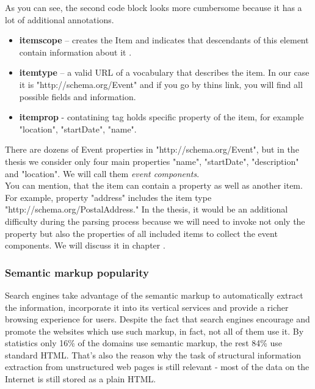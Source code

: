 As you can see, the second code block looks more cumbersome because it has a lot of additional annotations. 

\begin{itemize}
    \item \textbf{itemscope} – creates the Item and indicates that descendants of this element contain information about it \cite{Microdata}.
    \item \textbf{itemtype} – a valid URL of a vocabulary that describes the item. In our case it is "http://schema.org/Event" and if you go by thins link, you will find all possible fields and information. 
    \item \textbf{itemprop} - contatining tag holds specific property of the item, for example "location", "startDate", "name".
\end{itemize}

There are dozens of Event properties in "http://schema.org/Event", but in the thesis we consider only four main properties "name", "startDate", "description" and "location". We will call them \textit{event components}.\\

You can mention, that the item can contain a property as well as another item. For example, property "address" includes the item type "http://schema.org/PostalAddress." In the thesis, it would be an additional difficulty during the parsing process because we will need to invoke not only the property but also the properties of all included items to collect the event components. We will discuss it in chapter . 

\subsubsection*{Semantic markup popularity}

Search engines take advantage of the semantic markup to automatically extract the information, incorporate it into its vertical services and provide a richer browsing experience for users. Despite the fact that search engines encourage and promote the websites which use such markup, in fact, not all of them use it. By statistics only 16\% of the domains use semantic markup, the rest 84\% use standard HTML. That's also the reason why the task of structural information extraction from unstructured web pages is still relevant - most of the data on the Internet is still stored as a plain HTML.\\ 


